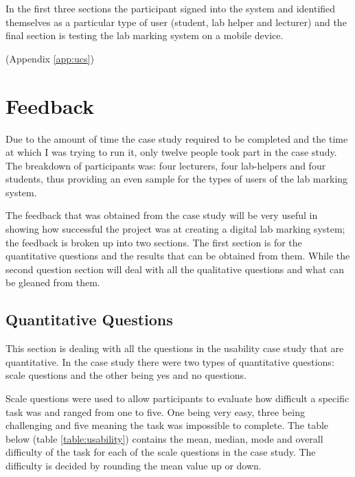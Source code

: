 \documentclass[11pt]{report}
\begin{document}
In the first three sections the participant signed into the system  and identified themselves as a particular type of user (student, lab helper and lecturer) and the final section is testing the lab marking system on a mobile device.



(Appendix \ref{app:ucs})

\section{Feedback}

Due to the amount of time the case study required to be completed and the time at which I was trying to run it, only twelve people took part in the case study. The breakdown of participants was: four lecturers, four lab-helpers and four students, thus providing an even sample for the types of users of the lab marking system.

The feedback that was obtained from the case study will be very useful in showing how successful the project was at creating a digital lab marking system; the feedback is broken up into two sections. The first section is for the quantitative questions and the results that can be obtained from them. While the second question section will deal with all the qualitative questions and what can be gleaned from them. 



\subsection{Quantitative Questions}

This section is dealing with all the questions in the usability case study that are quantitative. In the case study there were two types of quantitative questions: scale questions and the other being  yes and no questions.

Scale questions were used to allow participants to evaluate how difficult a specific task was and ranged from one to five. One being very easy, three being challenging and five meaning the task was impossible to complete. 
The table below (table \ref{table:usability}) contains the mean, median, mode and overall difficulty of the task for each of the scale questions in the case study. The difficulty is decided by rounding the mean value up or down.

\setlength\LTleft{0pt}
\setlength\LTright{0pt}
\end{document}
